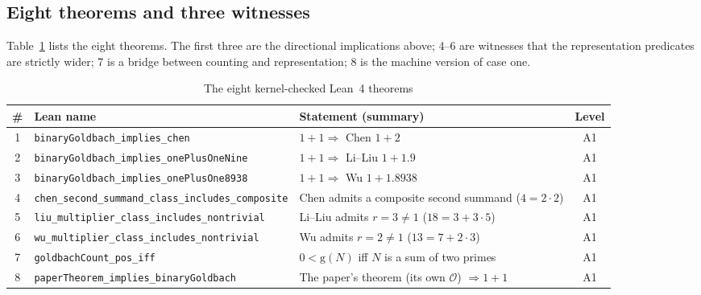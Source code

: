 \documentclass[11pt,a4paper]{article}
\theoremstyle{plain}
\theoremstyle{definition}
\newcommand{\gcount}{\mathrm{g}}
\begin{document}
\subsection{Eight theorems and three witnesses}
\label{sec:eight}

Table~\ref{tab:eight} lists the eight theorems. The first three are the directional implications above; 4--6 are witnesses that the representation predicates are strictly wider; 7 is a bridge between counting and representation; 8 is the machine version of case one.

\begin{table}[htbp]
\centering
\small
\caption{The eight kernel-checked Lean~4 theorems}
\label{tab:eight}
\begin{tabularx}{\textwidth}{@{}c
>{\raggedright\arraybackslash}p{}
>{\raggedright\arraybackslash}X c@{}}
\toprule
\# & Lean name & Statement (summary) & Level\\
\midrule
1 & \texttt{binaryGoldbach\_implies\_}\newline\texttt{chen} & $1+1\Rightarrow$ Chen $1+2$ & A1\\
2 & \texttt{binaryGoldbach\_implies\_}\newline\texttt{onePlusOneNine} & $1+1\Rightarrow$ Li--Liu $1+1.9$ & A1\\
3 & \texttt{binaryGoldbach\_implies\_}\newline\texttt{onePlusOne8938} & $1+1\Rightarrow$ Wu $1+1.8938$ & A1\\
4 & \texttt{chen\_second\_summand\_class\_}\newline\texttt{includes\_composite} & Chen admits a composite second summand ($4=2\cdot2$) & A1\\
5 & \texttt{liu\_multiplier\_class\_}\newline\texttt{includes\_nontrivial} & Li--Liu admits $r=3\ne1$ ($18=3+3\cdot5$) & A1\\
6 & \texttt{wu\_multiplier\_class\_}\newline\texttt{includes\_nontrivial} & Wu admits $r=2\ne1$ ($13=7+2\cdot3$) & A1\\
7 & \texttt{goldbachCount\_pos\_iff} & $0<\gcount(N)$ iff $N$ is a sum of two primes & A1\\
8 & \texttt{paperTheorem\_implies\_}\newline\texttt{binaryGoldbach} & The paper's theorem (its own $\mathcal O$) $\Rightarrow1+1$ & A1\\
\bottomrule
\end{tabularx}
\end{table}
\end{document}
